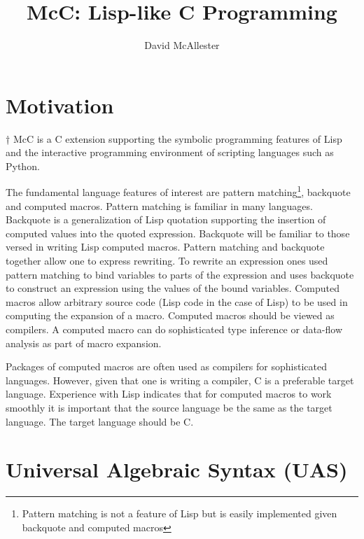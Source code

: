 \documentclass{article}
\title{McC:  Lisp-like C Programming}
\author{David McAllester}
\begin{document}
\maketitle

\section{Motivation}

\bigskip
\bigskip
†
McC is a C extension supporting the symbolic programming features of Lisp and the interactive programming environment of scripting languages such as Python.

The fundamental language features of interest are pattern matching\footnote{Pattern matching is not a feature of Lisp but is easily implemented given backquote and computed macros},
backquote and computed macros. Pattern matching is familiar in many languages.  Backquote is a generalization of Lisp quotation supporting
the insertion of computed values into the quoted expression. Backquote will be familiar to
those versed in writing Lisp computed macros. Pattern matching and backquote together allow one to express rewriting.  To rewrite an expression
ones used pattern matching to bind variables to parts of the expression and uses backquote to construct an expression using the values of the bound variables.
Computed macros allow arbitrary source code (Lisp code in the case of Lisp) to be
used in computing the expansion of a macro.  Computed macros should be viewed as compilers.  A computed macro can do
sophisticated type inference or data-flow analysis as part of macro expansion.

Packages of computed macros are often used as compilers for sophisticated languages.  However, given that one is writing a compiler, C is a preferable target language.
Experience with Lisp indicates that for computed macros to work smoothly it is important that the source language be the same as the target language.  The target language should be C.

\section{Universal Algebraic Syntax (UAS)}
\end{document}
